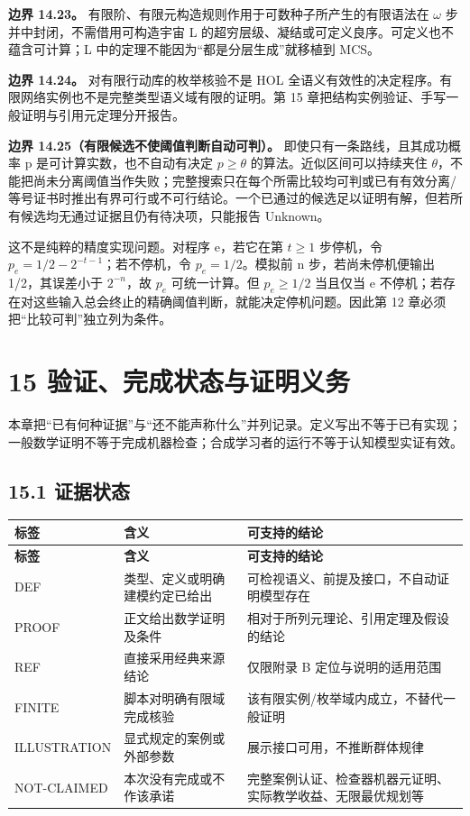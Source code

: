 \documentclass[UTF8,a4paper,zihao=-4,fontset=windows,openany]{ctexbook}
\newcommand{\mcsorigin}[1]{\par\noindent{\small\color{black!55}#1}\par\addvspace{0.8em}}
\begin{document}
\textbf{边界 14.23。} 有限阶、有限元构造规则作用于可数种子所产生的有限语法在 \(\omega\) 步并中封闭，不需借用可构造宇宙 L 的超穷层级、凝结或可定义良序。可定义也不蕴含可计算；L 中的定理不能因为“都是分层生成”就移植到 MCS。

\textbf{边界 14.24。} 对有限行动库的枚举核验不是 HOL 全语义有效性的决定程序。有限网络实例也不是完整类型语义域有限的证明。第 15 章把结构实例验证、手写一般证明与引用元定理分开报告。

\textbf{边界 14.25（有限候选不使阈值判断自动可判）。} 即使只有一条路线，且其成功概率 p 是可计算实数，也不自动有决定 \(p\ge\theta\) 的算法。近似区间可以持续夹住 \(\theta\)，不能把尚未分离阈值当作失败；完整搜索只在每个所需比较均可判或已有有效分离/等号证书时推出有界可行或不可行结论。一个已通过的候选足以证明有解，但若所有候选均无通过证据且仍有待决项，只能报告 Unknown。

这不是纯粹的精度实现问题。对程序 e，若它在第 \(t\ge 1\) 步停机，令 \(p_e=1/2-2^{-t-1}\)；若不停机，令 \(p_e=1/2\)。模拟前 n 步，若尚未停机便输出 1/2，其误差小于 \(2^{-n}\)，故 \(p_e\) 可统一计算。但 \(p_e\ge 1/2\) 当且仅当 e 不停机；若存在对这些输入总会终止的精确阈值判断，就能决定停机问题。因此第 12 章必须把“比较可判”独立列为条件。

\clearpage\chapter{15 验证、完成状态与证明义务}
\mcsorigin{原章节：15-验证与完成标准.md}
本章把“已有何种证据”与“还不能声称什么”并列记录。定义写出不等于已有实现；一般数学证明不等于完成机器检查；合成学习者的运行不等于认知模型实证有效。

\section{15.1 证据状态}
\begingroup\small\setlength{\tabcolsep}{4pt}
\begin{longtable}{>{\raggedright\arraybackslash}p{}>{\raggedright\arraybackslash}p{}>{\raggedright\arraybackslash}p{}}
\toprule
\textbf{标签} & \textbf{含义} & \textbf{可支持的结论} \\
\midrule
\endfirsthead
\toprule
\textbf{标签} & \textbf{含义} & \textbf{可支持的结论} \\
\midrule
\endhead
\bottomrule
\endfoot
\bottomrule
\endlastfoot
DEF & 类型、定义或明确建模约定已给出 & 可检视语义、前提及接口，不自动证明模型存在 \\
PROOF & 正文给出数学证明及条件 & 相对于所列元理论、引用定理及假设的结论 \\
REF & 直接采用经典来源结论 & 仅限附录 B 定位与说明的适用范围 \\
FINITE & 脚本对明确有限域完成核验 & 该有限实例/枚举域内成立，不替代一般证明 \\
ILLUSTRATION & 显式规定的案例或外部参数 & 展示接口可用，不推断群体规律 \\
NOT-CLAIMED & 本次没有完成或不作该承诺 & 完整案例认证、检查器机器元证明、实际教学收益、无限最优规划等 \\
\end{longtable}
\endgroup
\end{document}
